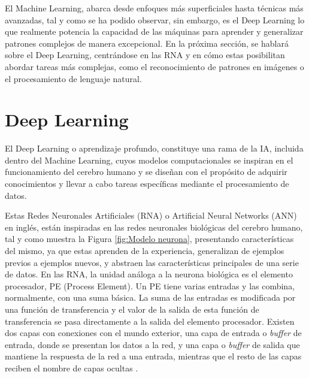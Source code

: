 El Machine Learning, abarca desde enfoques más superficiales hasta técnicas más avanzadas, tal y como se ha podido observar, sin embargo, es el Deep Learning lo que realmente potencia la capacidad de las máquinas para aprender y generalizar patrones complejos de manera excepcional. En la próxima sección, se hablará sobre el Deep Learning, centrándose en las RNA y en cómo estas posibilitan abordar tareas más complejas, como el reconocimiento de patrones en imágenes o el procesamiento de lenguaje natural.


\section{Deep Learning}
\label{sec:DeepLearning} 
El Deep Learning o aprendizaje profundo, constituye una rama de la IA, incluida dentro del Machine Learning, cuyos modelos computacionales se inspiran en el funcionamiento del cerebro humano y se diseñan con el propósito de adquirir conocimientos y llevar a cabo tareas específicas mediante el procesamiento de datos. %

Estas Redes Neuronales Artificiales (RNA) o Artificial Neural Networks (ANN) en inglés, están inspiradas en las redes neuronales biológicas del cerebro humano, tal y como muestra la Figura \ref{fig:Modelo neurona}, presentando características del mismo, ya que estas aprenden de la experiencia, generalizan de ejemplos previos a ejemplos nuevos, y abstraen las características principales de una serie de datos. En las RNA, la unidad análoga a la neurona biológica es el elemento procesador, PE (Process Element). Un PE tiene varias entradas y las combina, normalmente, con una suma básica. La suma de las entradas es modificada por una función de transferencia y el valor de la salida de esta función de transferencia se pasa directamente a la salida del elemento procesador. Existen dos capas con conexiones con el mundo exterior, una capa de entrada o \textit{buffer} de entrada, donde se presentan los datos a la red, y una capa o \textit{buffer} de salida que mantiene la respuesta de la red a una entrada, mientras que el resto de las capas reciben el nombre de capas ocultas \cite{Basogain08}.\\

